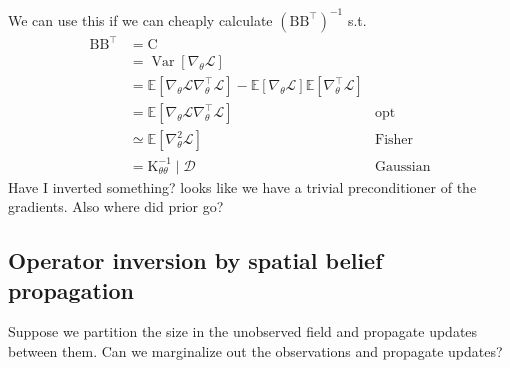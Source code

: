 \documentclass{article}
\newcommand{\var}{\operatorname{Var}}
\newcommand{\mm}[1]{\mathrm{#1}}
\newcommand{\gvn}{\mid}
\newcommand{\Ex}{\mathbb{E}}
\begin{document}
We can use this if we can cheaply calculate \((\mm{B}\mm{B}^{\top})^{-1}\) s.t.
\begin{align*}
\mm{B}\mm{B}^{\top}
    &=\mm{C}\\
    &= \var\left[\nabla_{\theta}\mathcal{L}\right]\\
    &= \Ex\left[\nabla_{\theta}\mathcal{L}\nabla_{\theta}^{\top}\mathcal{L}\right] 
    - \Ex\left[\nabla_{\theta}\mathcal{L}\right]\Ex\left[\nabla_{\theta}^{\top}\mathcal{L}\right]\\
    &= \Ex\left[\nabla_{\theta}\mathcal{L}\nabla_{\theta}^{\top}\mathcal{L}\right] &\text{opt}\\
    &\simeq \Ex\left[\nabla^2_{\theta}\mathcal{L}\right] &\text{Fisher}\\
    &= \mm{K}_{\theta\theta}^{-1} \gvn\mathcal{D} &\text{Gaussian}
\end{align*}
Have I inverted something? looks like we have a trivial preconditioner of the gradients.
Also where did prior go?


\subsection{Operator inversion by spatial belief propagation}

Suppose we partition the size in the unobserved field and propagate updates between them.
Can we marginalize out the observations and propagate updates?
\end{document}
